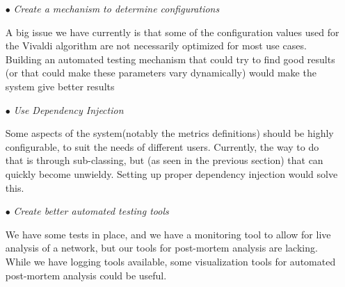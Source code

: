 \documentclass[11pt,a4paper]{article}
\begin{document}
 \begin{itemize}
 	\item[$\bullet$]\emph{Create a mechanism to determine configurations }
 	
	A big issue we have currently is that some of the configuration values used for the Vivaldi algorithm are not necessarily optimized for most use cases. Building an automated testing mechanism that could try to find good results (or that could make these parameters vary dynamically) would make the system give better results
	
	\item[$\bullet$] \emph{Use Dependency Injection}
		
	Some aspects of the system(notably the metrics definitions) should be highly configurable, to suit the needs of different users. Currently, the way to do that is through sub-classing, but (as seen in the previous section) that can quickly become unwieldy. Setting up proper dependency injection would solve this.
	
	\item[$\bullet$] \emph{Create better automated testing tools}
	
	We have some tests in place, and we have a monitoring tool to allow for live analysis of a network, but our tools for post-mortem analysis are lacking. While we have logging tools available, some visualization tools for automated post-mortem analysis could be useful.
	 
 \end{itemize}
\end{document}
